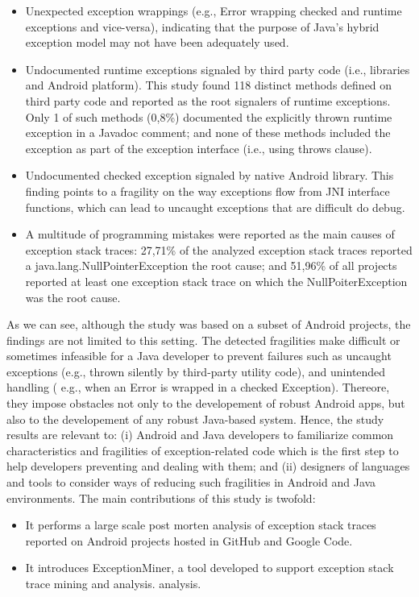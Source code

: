 \documentclass[conference]{IEEEtran}
\begin{document}
\begin{itemize}

   \item  Unexpected exception wrappings (e.g., Error wrapping checked and runtime
    exceptions and vice-versa), indicating that the purpose of Java's hybrid exception model may not have been adequately used.

   \item Undocumented runtime exceptions signaled by third party code (i.e., libraries and Android platform). 
This study found 118 distinct methods defined on third party code and  reported as the root signalers of 
runtime exceptions. Only 1 of such methods (0,8\%) documented the explicitly thrown runtime exception 
in a Javadoc comment; and none of these methods included the exception as part of the exception 
interface (i.e., using throws clause).

   \item Undocumented checked exception signaled by native Android library. This finding points to a fragility 
on the way exceptions flow from JNI interface functions, which can lead to uncaught exceptions that are difficult do 
debug. 

  \item  A multitude of programming mistakes were reported as the main causes of exception stack traces:
 27,71\% of the analyzed exception stack traces reported a java.lang.NullPointerException the root cause;
and  51,96\% of all projects reported at least one exception stack trace on which the NullPoiterException
was the root cause.

\end{itemize}

As we can see, although the study was based on a subset of Android projects, 
the findings are not limited to this setting. The detected fragilities make difficult
or sometimes infeasible for a Java developer to prevent failures such as 
uncaught exceptions (e.g., thrown silently by third-party utility code), and 
unintended handling ( e.g., when an Error is wrapped in a checked Exception).
Thereore, they impose obstacles not only to the developement of robust Android apps, 
but also to the developement of any robust Java-based system. 
Hence, the study results are relevant to: (i) Android and 
Java developers to familiarize common characteristics and fragilities of exception-related code 
which is the first step to help developers preventing and dealing with them; and (ii) designers of languages and tools 
to consider ways of reducing such fragilities in Android and Java environments.
The main contributions of this study is twofold:
\begin{itemize}

  \item  It performs a large scale post morten analysis of exception stack traces reported on Android projects hosted in GitHub and Google Code.
  \item  It introduces ExceptionMiner, a tool developed to support exception stack trace mining and analysis.
    analysis.

\end{itemize}
\end{document}
